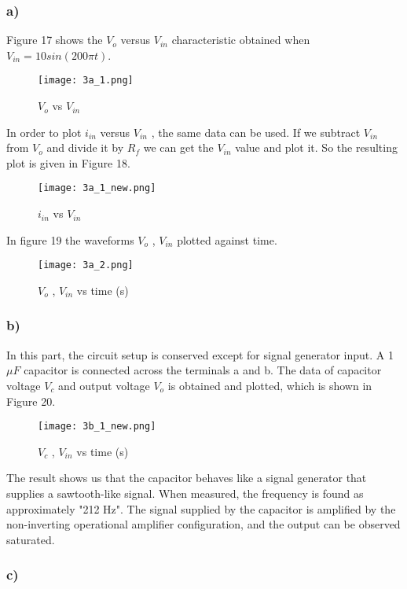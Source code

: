 \documentclass[letterpaper,12pt]{article}
\begin{document}
\subsubsection{a)}
Figure 17 shows the \(V_{o}\) versus \(V_{in}\) characteristic obtained when \(V_{in}= 10sin(200\pi t) \).
\begin{figure}[H]
	\centering
   \texttt{[image: 3a\_1.png]}
   \caption{\(V_{o}\) vs \(V_{in}\)}
\end{figure}
In order to plot \(i_{in}\) versus \(V_{in}\) , the same data can be used. If we subtract \(V_{in}\) from \(V_o\) and divide it by \(R_f\) we can get the \(V_{in}\) value and plot it. So the resulting plot is given in Figure 18.

\begin{figure}[H]
	\centering
   \texttt{[image: 3a\_1\_new.png]}
   \caption{\(i_{in}\) vs \(V_{in}\)  }
\end{figure}

In figure 19 the waveforms \(V_{o}\) , \(V_{in}\) plotted against time. 
\begin{figure}[H]
	\centering
   \texttt{[image: 3a\_2.png]}
   \caption{\(V_{o}\) , \(V_{in}\) vs time (s) }
\end{figure}


\subsubsection{b)}
In this part, the circuit setup is conserved except for signal generator input. A 1 \(\mu F\) capacitor is connected across the terminals a and b.  
The data of capacitor voltage \(V_c\) and output voltage \(V_o\) is obtained and plotted, which is shown in Figure 20. 
\begin{figure}[H]
	\centering
   \texttt{[image: 3b\_1\_new.png]}
   \caption{\(V_{c}\) , \(V_{in}\) vs time (s) }
\end{figure}
The result shows us that the capacitor behaves like a signal generator that supplies a sawtooth-like signal. When measured, the frequency is found as approximately "212 Hz". The signal supplied by the capacitor is amplified by the non-inverting operational amplifier configuration, and the output can be observed saturated. 
\subsubsection{c)}
\end{document}
